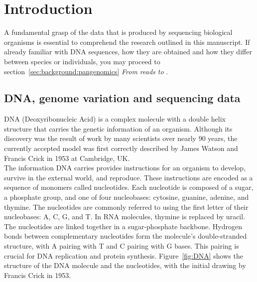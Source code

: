 \chapter*{Introduction}
\label{sec:background}
A fundamental grasp of the data that is produced by sequencing biological organisms is essential to comprehend the research outlined in this manuscript. If already familiar with DNA sequences, how they are obtained and how they differ between species or individuals, you may proceed to section~\ref{sec:background:pangenomics} \emph{From reads to \kmers}.
\section*{DNA, genome variation and sequencing data}
\label{sec:dna}
DNA (Deoxyribonucleic Acid) is a complex molecule with a double helix structure that carries the genetic information of an organism. Although its discovery was the result of work by many scientists over nearly 90 years, the currently accepted model was first correctly described by James Watson and Francis Crick in 1953 at Cambridge, UK.\\
The information DNA carries provides instructions for an organism to develop, survive in the external world, and reproduce. These instructions are encoded as a sequence of monomers called nucleotides. Each nucleotide is composed of a sugar, a phosphate group, and one of four nucleobases: cytosine, guanine, adenine, and thymine. The nucleotides are commonly referred to using the first letter of their nucleobases: A, C, G, and T. In RNA molecules, thymine is replaced by uracil.\\
The nucleotides are linked together in a sugar-phosphate backbone. Hydrogen bonds between complementary nucleotides form the molecule's double-stranded structure, with A pairing with T and C pairing with G bases. This pairing is crucial for DNA replication and protein synthesis. Figure~\ref{fig:DNA} shows the structure of the DNA molecule and the nucleotides, with the initial drawing by Francis Crick in 1953.
